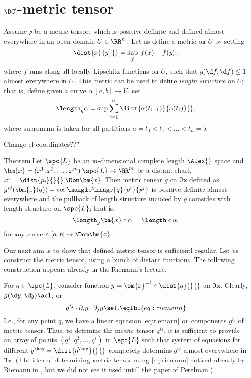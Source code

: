 \qeds

\section{$\DC'$-metric tensor}

Assume $g$ be a metric tensor,
which is positive definite and defined almost everywhere in an open domain $U\in\RR^m$.
Let us define a metric on $U$ by setting
\[\dist{x}{y}{}
=
\sup_f{|f(x)-f(y)|},\]
where $f$ runs along all locally Lipschitz functions on $U$, such that $g(\d f,\d f)\le 1$ almost everywhere in $U$.
This metric can be used to define \emph{length structure} on $U$;
that is, define given a curve $\alpha\:[a,b]\to U$, 
set 
\[\length_g\alpha=\sup\sum_{i=1}^n\dist{\alpha(t_{i-1})}{\alpha(t_{i})}{},\]
where supremum is taken for all partitions $a=t_0<t_1<\dots<t_n=b$.

Change of coordinates???

\begin{thm}{Theorem}
Let $\spc{L}$ be an $m$-dimensional complete length $\Alex{}$ space 
and $\bm{x}=(x^1,x^2,\dots,x^m)\:\spc{L}\to\RR^m$ be a distant chart, $x^i=\dist{p_i}{}{}|{\Dom \bm{x}}$.
Then metric tensor $g$ on $\Im\bm{x}$
defined as $g^{ij}(\bm{x}(q))=\cos\mangle\hinge{q}{p^i}{p^j}$ 
is positive definite almost everywhere 
and the pullback of length structure induced  by $g$ 
coinsides with length structure on $\spc{L}$;
that is, 
\[\length_g\bm{x}\circ\alpha=\length\circ\alpha.\] 
for any curve $\alpha\:[a,b]\to \Dom\bm{x}$.
\end{thm}

Our next aim is to show that defined metric tensor is sufficientl regular.
Let us construct the metric tensor, using a bunch of distant functions.
The following construction appears already in the Riemann's lecture. 

For $q\in\spc{L}$,
consider function $y=\bm{x}^{-1}\circ\dist{q}{}{}$ on $\Im\bm{x}$.
Clearly, 
$g(\d y,\d y)\ae1$, 
or
\[g^{ij}\cdot\partial_iy\cdot\partial_jy
\ae
1.
\eqlbl{eq:riemann}\]
I.e., for any point $q$,
we have a linear equasion \ref{eq:riemann} on components $g^{ij}$ of metric tensor.
Thus, to detrmine the metric tensor $g^{ij}$, 
it is sufficient to provide an array of points $(q^1,q^2,\dots, q^s)$ in $\spc{L}$ 
such that system of equasions for different $y^\kay=\dist{q^\kay}{}{}$ 
completely determins $g^{ij}$ almost everywhere in $\Im\bm{x}$.
(The idea of determining metric tensor using \ref{eq:riemann}
noticed already by Riemann in \cite{riemann},
but we did not see it used untill the paper of Perelman.)

